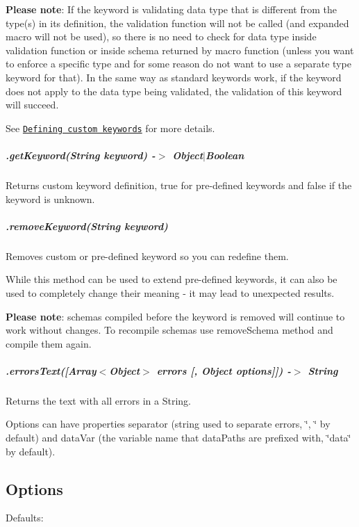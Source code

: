 {\bfseries Please note}\+: If the keyword is validating data type that is different from the type(s) in its definition, the validation function will not be called (and expanded macro will not be used), so there is no need to check for data type inside validation function or inside schema returned by macro function (unless you want to enforce a specific type and for some reason do not want to use a separate {\ttfamily type} keyword for that). In the same way as standard keywords work, if the keyword does not apply to the data type being validated, the validation of this keyword will succeed.

See \href{#defining-custom-keywords}{\tt Defining custom keywords} for more details.

\subparagraph*{.get\+Keyword(\+String keyword) -\/$>$ Object$\vert$\+Boolean}

Returns custom keyword definition, {\ttfamily true} for pre-\/defined keywords and {\ttfamily false} if the keyword is unknown.

\subparagraph*{.remove\+Keyword(\+String keyword)}

Removes custom or pre-\/defined keyword so you can redefine them.

While this method can be used to extend pre-\/defined keywords, it can also be used to completely change their meaning -\/ it may lead to unexpected results.

{\bfseries Please note}\+: schemas compiled before the keyword is removed will continue to work without changes. To recompile schemas use {\ttfamily remove\+Schema} method and compile them again.

\subparagraph*{.errors\+Text(\mbox{[}Array$<$Object$>$ errors \mbox{[}, Object options\mbox{]}\mbox{]}) -\/$>$ String}

Returns the text with all errors in a String.

Options can have properties {\ttfamily separator} (string used to separate errors, \char`\"{}, \char`\"{} by default) and {\ttfamily data\+Var} (the variable name that data\+Paths are prefixed with, \char`\"{}data\char`\"{} by default).

\subsection*{Options}

Defaults\+:


